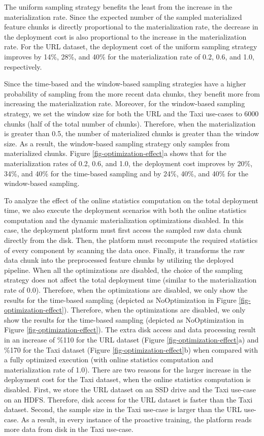 The uniform sampling strategy benefits the least from the increase in the materialization rate.
Since the expected number of the sampled materialized feature chunks is directly proportional to the materialization rate, the decrease in the deployment cost is also proportional to the increase in the materialization rate. 
For the URL dataset, the deployment cost of the uniform sampling strategy improves by 14\%, 28\%, and 40\% for the materialization rate of 0.2, 0.6, and 1.0, respectively.

Since the time-based and the window-based sampling strategies have a higher probability of sampling from the more recent data chunks, they benefit more from increasing the materialization rate.
Moreover, for the window-based sampling strategy, we set the window size for both the URL and the Taxi use-cases to 6000 chunks (half of the total number of chunks).
Therefore, when the materialization is greater than 0.5, the number of materialized chunks is greater than the window size.
As a result, the window-based sampling strategy only samples from materialized chunks.
Figure \ref{fig-optimization-effect}a shows that for the materialization rates of 0.2, 0.6, and 1.0, the deployment cost improves by 20\%, 34\%, and 40\% for the time-based sampling and by 24\%, 40\%, and 40\% for the window-based sampling.

To analyze the effect of the online statistics computation on the total deployment time, we also execute the deployment scenarios with both the online statistics computation and the dynamic materialization optimizations disabled.
In this case, the deployment platform must first access the sampled raw data chunk directly from the disk.
Then, the platform must recompute the required statistics of every component by scanning the data once.
Finally, it transforms the raw data chunk into the preprocessed feature chunks by utilizing the deployed pipeline.
When all the optimizations are disabled, the choice of the sampling strategy does not affect the total deployment time (similar to the materialization rate of 0.0).
Therefore, when the optimizations are disabled, we only show the results for the time-based sampling (depicted as NoOptimization in Figure \ref{fig-optimization-effect}).
Therefore, when the optimizations are disabled, we only show the results for the time-based sampling (depicted as NoOptimization in Figure \ref{fig-optimization-effect}).
The extra disk access and data processing result in an increase of \%110 for the URL dataset (Figure \ref{fig-optimization-effect}a) and \%170 for the Taxi dataset (Figure \ref{fig-optimization-effect}b) when compared with a fully optimized execution (with online statistics computation and materialization rate of 1.0).
There are two reasons for the larger increase in the deployment cost for the Taxi dataset, when the online statistics computation is disabled.
First, we store the URL dataset on an SSD drive and the Taxi use-case on an HDFS.
Therefore, disk access for the URL dataset is faster than the Taxi dataset.
Second, the sample size in the Taxi use-case is larger than the URL use-case.
As a result, in every instance of the proactive training, the platform reads more data from disk in the Taxi use-case.

